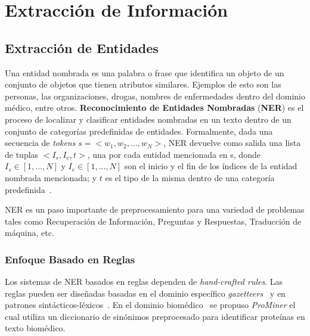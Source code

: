 \chapter{Extracción de Información}\label{chapter:information_extraction}

\section{Extracción de Entidades}

Una entidad nombrada es una palabra o frase que identifica un objeto de un conjunto de objetos que tienen atributos similares. Ejemplos de esto son las personas, las organizaciones, drogas, nombres de enfermedades dentro del dominio m\'edico, entre otros. \textbf{Reconocimiento de Entidades Nombradas} (\textbf{NER}) es el proceso de localizar y clasificar entidades nombradas en un texto dentro de un conjunto de categor\'ias predefinidas de entidades.
Formalmente, dada una secuencia de \emph{tokens} $s=<w_1, w_2, ..., w_N >$, NER devuelve como salida una lista de tuplas $<I_s, I_e, t>$, una por cada entidad mencionada en s, donde $I_s \in [1,...,N]$ y $I_e \in [1,...,N]$ son el inicio y el fin de los \'indices de la entidad nombrada mencionada; y $t$ es el tipo de la misma dentro de una categor\'ia predefinida~\cite{li2018survey}. 

NER es un paso importante de preprocesamiento para una variedad de problemas tales como Recuperaci\'on de Informaci\'on, Preguntas y Respuestas, Traducci\'on de m\'aquina, etc.


\subsection{Enfoque Basado en Reglas}

Los sistemas de NER basados en reglas dependen de \emph{hand-crafted rules}. Las reglas pueden ser dise\~nadas basadas en el dominio espec\'ifico \emph{gazetteers}~\cite{etzioni2005unsupervised} y en patrones sint\'acticos-l\'exicos~\cite{zhang2013unsupervised}. En el dominio biom\'edico~\cite{hanisch2005prominer} se propuso \emph{ProMiner} el cual utiliza un diccionario de sin\'onimos preprocesado para identificar prote\'inas en texto biom\'edico.

